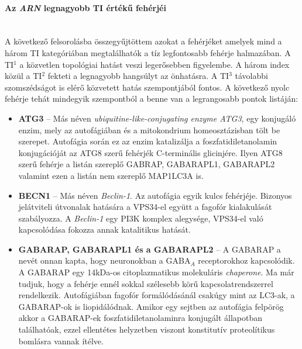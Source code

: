 \documentclass[a4paper,12pt]{article}
\begin{document}
				\paragraph{Az \textit{ARN} legnagyobb TI értékű fehérjéi} \mbox{}\\
				A következő felsorolásba összegyűjtöttem azokat a fehérjéket amelyek mind a három TI kategóriában megtalálhatók a tíz legfontosabb fehérje halmazában. 			
				A TI$^1$ a közvetlen topológiai hatást veszi legerősebben figyelembe. A három index közül a TI$^2$ fekteti a legnagyobb hangsúlyt az önhatásra. A TI$^3$  távolabbi szomszédságot is elérő közvetett hatás szempontjából fontos. A következő nyolc fehérje tehát mindegyik szempontból a benne van a legrangosabb pontok listáján:
				
				\begin{itemize}
					\item \textbf{ATG3} -- Más néven \textit{ubiquitine-like-conjugating enzyme ATG3}, egy konjugáló enzim, mely az autofágiában és a mitokondrium homeosztázisban tölt be szerepet. Autofágia során ez az enzim katalizálja a foszfatidiletanolamin konjugációját az ATG8 szerű fehérjék C-terminális glicinjére. Ilyen ATG8 szerű fehérje a listán szereplő GABRAP, GABARAPL1, GABARAPL2 valamint ezen a listán nem szereplő MAP1LC3A is. \cite{autophagy_proteins}

					\item \textbf{BECN1} -- Más néven \textit{Beclin-1}. Az autofágia egyik kulcs fehérjéje. Bizonyos jelátviteli útvonalak hatására a VPS34-el együtt a fagofór kialakulását szabályozza. A \textit{Beclin-1} egy PI3K komplex alegysége, VPS34-el való kapcsolódása fokozza annak katalitikus hatását. \cite{autophagy_proteins}
					
					\item \textbf{GABARAP, GABARAPL1 és a GABARAPL2} -- A GABARAP a nevét onnan kapta, hogy neuronokban a GABA$_A$ receptorokhoz kapcsolódik. A GABARAP egy 14kDa-os citoplazmatikus molekuláris \textit{chaperone}. Ma már tudjuk, hogy a fehérje ennél sokkal szélesebb körű kapcsolatrendszerrel rendelkezik. Autofágiában fagofór formálódásánál csakúgy mint az LC3-ak, a GABARAP-ok is liopidálódnak. Amikor egy sejtben az autofágia felpörög akkor a GABARAP-ek foszfatidiletanolaminra konjugált állapotban találhatóak, ezzel ellentétes helyzetben viszont konstitutív proteolítikus bomlásra vannak ítélve. \cite{atg8_like}


\end{itemize}
\end{document}
